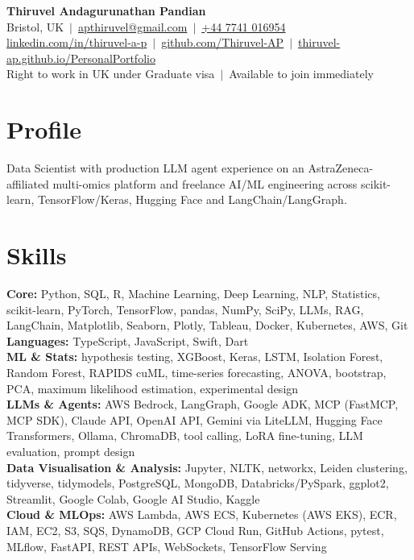 \documentclass[a4paper,11pt]{article}
\begin{document}
\fontsize{11}{13.2}\selectfont

\begin{center}
  {\LARGE\bfseries Thiruvel Andagurunathan Pandian}\\[3pt]
  Bristol, UK \,$|$\, \href{mailto:apthiruvel@gmail.com}{apthiruvel@gmail.com} \,$|$\, \href{tel:+447741016954}{+44 7741 016954}\\[1pt]
\href{https://www.linkedin.com/in/thiruvel-a-p/}{linkedin.com/in/thiruvel-a-p} \,$|$\, \href{https://github.com/Thiruvel-AP}{github.com/Thiruvel-AP} \,$|$\, \href{https://thiruvel-ap.github.io/PersonalPortfolio/}{thiruvel-ap.github.io/PersonalPortfolio}\\[1pt]
  Right to work in UK under Graduate visa \,$|$\, Available to join immediately
\end{center}

\section{Profile}
Data Scientist with production LLM agent experience on an AstraZeneca-affiliated multi-omics platform and freelance AI/ML engineering across scikit-learn, TensorFlow/Keras, Hugging Face and LangChain/LangGraph.

\section{Skills}
\textbf{Core:} Python, SQL, R, Machine Learning, Deep Learning, NLP, Statistics, scikit-learn, PyTorch, TensorFlow, pandas, NumPy, SciPy, LLMs, RAG, LangChain, Matplotlib, Seaborn, Plotly, Tableau, Docker, Kubernetes, AWS, Git\\[2pt]
\textbf{Languages:} TypeScript, JavaScript, Swift, Dart\\[2pt]
\textbf{ML \& Stats:} hypothesis testing, XGBoost, Keras, LSTM, Isolation Forest, Random Forest, RAPIDS cuML, time-series forecasting, ANOVA, bootstrap, PCA, maximum likelihood estimation, experimental design\\[2pt]
\textbf{LLMs \& Agents:} AWS Bedrock, LangGraph, Google ADK, MCP (FastMCP, MCP SDK), Claude API, OpenAI API, Gemini via LiteLLM, Hugging Face Transformers, Ollama, ChromaDB, tool calling, LoRA fine-tuning, LLM evaluation, prompt design\\[2pt]
\textbf{Data Visualisation \& Analysis:} Jupyter, NLTK, networkx, Leiden clustering, tidyverse, tidymodels, PostgreSQL, MongoDB, Databricks/PySpark, ggplot2, Streamlit, Google Colab, Google AI Studio, Kaggle\\[2pt]
\textbf{Cloud \& MLOps:} AWS Lambda, AWS ECS, Kubernetes (AWS EKS), ECR, IAM, EC2, S3, SQS, DynamoDB, GCP Cloud Run, GitHub Actions, pytest, MLflow, FastAPI, REST APIs, WebSockets, TensorFlow Serving
\end{document}
